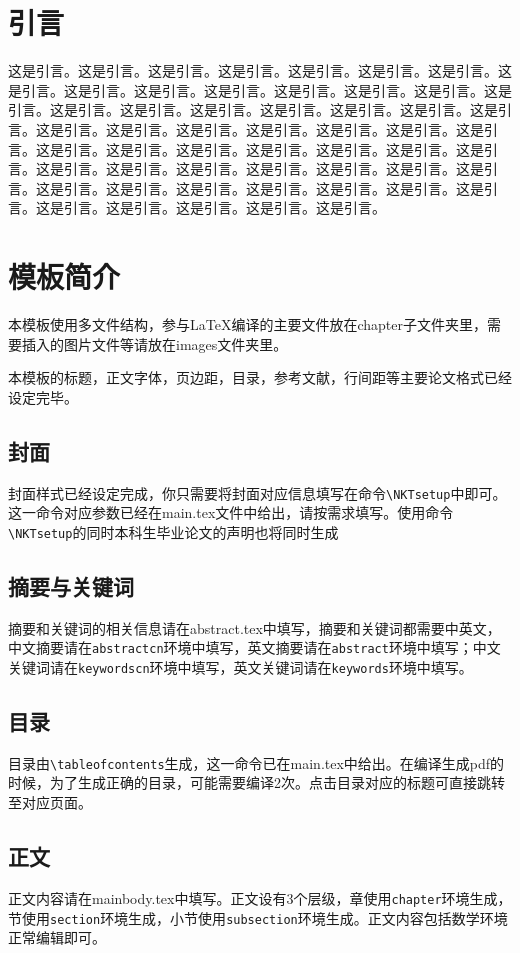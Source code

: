 
\chapter{引言}
这是引言。这是引言。这是引言。这是引言。这是引言。这是引言。这是引言。这是引言。这是引言。这是引言。这是引言。这是引言。这是引言。这是引言。这是引言。这是引言。这是引言。这是引言。这是引言。这是引言。这是引言。这是引言。这是引言。这是引言。这是引言。这是引言。这是引言。这是引言。这是引言。这是引言。这是引言。这是引言。这是引言。这是\cite{test}引言。这是引言。这是引言。这是引言。这是引言。这是引言。这是引言。这是引言。这是引言。这是引言。这是引言。这是引言。这是引言。这是引言。这是引言。这是引言。这是引言。这是引言。这是引言。这是引言。这是引言。这是引言。


\chapter{模板简介}
本模板使用多文件结构，参与\LaTeX 编译的主要文件放在chapter子文件夹里，需要插入的图片文件等请放在images文件夹里。

本模板的标题，正文字体，页边距，目录，参考文献，行间距等主要论文格式已经设定完毕。
\section{封面}
封面样式已经设定完成，你只需要将封面对应信息填写在命令\verb|\NKTsetup|中即可。这一命令对应参数已经在main.tex文件中给出，请按需求填写。使用命令\verb|\NKTsetup|的同时本科生毕业论文的声明也将同时生成
\section{摘要与关键词}
摘要和关键词的相关信息请在abstract.tex中填写，摘要和关键词都需要中英文，中文摘要请在\verb|abstractcn|环境中填写，英文摘要请在\verb|abstract|环境中填写；中文关键词请在\verb|keywordscn|环境中填写，英文关键词请在\verb|keywords|环境中填写。
\section{目录}
目录由\verb|\tableofcontents|生成，这一命令已在main.tex中给出。在编译生成pdf的时候，为了生成正确的目录，可能需要编译2次。点击目录对应的标题可直接跳转至对应页面。
\section{正文}
正文内容请在mainbody.tex中填写。正文设有3个层级，章使用\verb|chapter|环境生成，节使用\verb|section|环境生成，小节使用\verb|subsection|环境生成。正文内容包括数学环境正常编辑即可。
